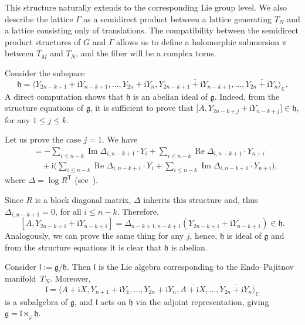 \documentclass[10pt,a4paper]{amsart}
\newcommand{\C}{{\mathbb C}}
\newcommand{\6}{\partial}
\renewcommand{\Re}{\operatorname{Re}}
\renewcommand{\Im}{\operatorname{Im}}
\numberwithin{equation}{section}
\begin{document}
This structure naturally extends to the corresponding Lie group level.
We also describe the lattice $\Gamma$ as a semidirect product between a lattice generating $T_N$ and a lattice consisting only of translations. The compatibility between the semidirect product structures of $G$ and $\Gamma$ allows us to define a holomorphic submersion $\pi$ between $T_M$ and $T_N$, and the fiber will be a complex torus.

Consider the subspace
\[
\mathfrak{h} = \bigl\langle Y_{2n-k + 1} + \mathrm{i} Y_{n-k+1}, \dots , Y_{2n} + \mathrm{i} Y_n, \overline{Y_{2n-k + 1} + \mathrm{i} Y_{n-k+1}}, \dots , \overline{Y_{2n} + \mathrm{i} Y_n} \bigr\rangle_\C.
 \]
A direct computation shows that $\mathfrak{h}$ is an abelian ideal of $\mathfrak{g}$. Indeed, from the structure equations of $\mathfrak{g}$, it is sufficient to prove that $\bigl[A,Y_{2n-k + j} + \mathrm{i} Y_{n-k+j}\bigr] \in \mathfrak{h}$, for any $ 1 \leq j \leq k$.

Let us prove the case $j=1$. We have{\samepage
\begin{align*}
[A, Y_{2n-k+1} + \mathrm{i} Y_{n-k+1}]
 &= -\sum_{i \leq n-k} \Im \Delta_{i, n-k+1} \cdot Y_i
 + \sum_{i \leq n-k} \Re \Delta_{i, n-k+1} \cdot Y_{n+i} \\
 &\quad + \mathrm{i} \biggl( \sum_{i \leq n-k} \Re \Delta_{i, n-k+1} \cdot Y_i
 + \sum_{i \leq n-k} \Im \Delta_{i, n-k+1} \cdot Y_{n+i} \biggr),
\end{align*}
where $\Delta = \log R^{\mathsf{T}}$ (see~\cite[Theorem~3.1]{cos}).}

Since $R$ is a block diagonal matrix, $\Delta$ inherits this structure and, thus $\Delta_{i, n-k+1}=0$, for all $i\leq n-k$.
Therefore,
\[
[A, Y_{2n-k+1} + \mathrm{i} Y_{n-k+1}]=\Delta_{n-k+1, n-k+1}(Y_{2n-k+1}+\mathrm{i}Y_{n-k+1})\in \mathfrak{h}.
\]
Analogously, we can prove the same thing for any $j$, hence, $\mathfrak{h}$ is ideal of $\mathfrak{g}$ and from the structure equations it is clear that $\mathfrak{h}$ is abelian.


Consider $\mathfrak{l}:=\mathfrak{g}/\mathfrak{h}$. Then $\mathfrak{l}$ is the Lie algebra corresponding to the Endo--Pajitnov manifold~$T_N$.
Moreover,
\[
 \mathfrak{l} = \bigl\langle A+\mathrm{i}X, Y_{n+ 1} + \mathrm{i} Y_{1}, \dots , Y_{2n} + \mathrm{i} Y_n, \overline{A+\mathrm{i}X}, \dots , \overline{ Y_{2n} + \mathrm{i} Y_n} \bigr\rangle_\C
 \]
 is a subalgebra of $\mathfrak{g}$, and $\mathfrak{l}$ acts on $\mathfrak{h}$ via the adjoint representation, giving $\mathfrak{g}=\mathfrak{l} \rtimes_\varphi \mathfrak{h}$.
\end{document}
